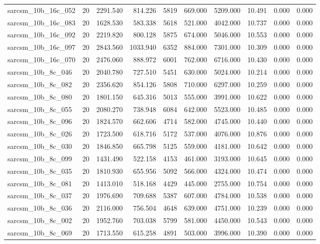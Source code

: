 \begin{tabular}{lrrrrrrrrr}
sarcsm\_10b\_16c\_052 & 20 & 2291.540 & 814.226 & 5819 & 669.000 & 5209.000 & 10.491 & 0.000 & 0.000 \\
sarcsm\_10b\_16c\_083 & 20 & 1628.530 & 583.338 & 5618 & 521.000 & 4042.000 & 10.737 & 0.000 & 0.000 \\
sarcsm\_10b\_16c\_092 & 20 & 2219.820 & 800.128 & 5875 & 674.000 & 5046.000 & 10.553 & 0.000 & 0.000 \\
sarcsm\_10b\_16c\_097 & 20 & 2843.560 & 1033.940 & 6352 & 884.000 & 7301.000 & 10.309 & 0.000 & 0.000 \\
sarcsm\_10b\_16c\_070 & 20 & 2476.060 & 888.972 & 6001 & 762.000 & 6716.000 & 10.430 & 0.000 & 0.000 \\
sarcsm\_10b\_8c\_046 & 20 & 2040.780 & 727.510 & 5451 & 630.000 & 5024.000 & 10.214 & 0.000 & 0.000 \\
sarcsm\_10b\_8c\_082 & 20 & 2356.620 & 854.126 & 5808 & 710.000 & 6297.000 & 10.259 & 0.000 & 0.000 \\
sarcsm\_10b\_8c\_080 & 20 & 1801.150 & 645.316 & 5013 & 555.000 & 3991.000 & 10.622 & 0.000 & 0.000 \\
sarcsm\_10b\_8c\_055 & 20 & 2080.270 & 738.948 & 6084 & 642.000 & 5523.000 & 10.485 & 0.000 & 0.000 \\
sarcsm\_10b\_8c\_096 & 20 & 1824.570 & 662.606 & 4714 & 582.000 & 4745.000 & 10.440 & 0.000 & 0.000 \\
sarcsm\_10b\_8c\_026 & 20 & 1723.500 & 618.716 & 5172 & 537.000 & 4076.000 & 10.876 & 0.000 & 0.000 \\
sarcsm\_10b\_8c\_030 & 20 & 1846.850 & 665.798 & 5125 & 559.000 & 4181.000 & 10.642 & 0.000 & 0.000 \\
sarcsm\_10b\_8c\_099 & 20 & 1431.490 & 522.158 & 4153 & 461.000 & 3193.000 & 10.645 & 0.000 & 0.000 \\
sarcsm\_10b\_8c\_035 & 20 & 1810.930 & 655.956 & 5092 & 566.000 & 4324.000 & 10.474 & 0.000 & 0.000 \\
sarcsm\_10b\_8c\_081 & 20 & 1413.010 & 518.168 & 4429 & 445.000 & 2755.000 & 10.754 & 0.000 & 0.000 \\
sarcsm\_10b\_8c\_037 & 20 & 1976.690 & 709.688 & 5387 & 607.000 & 4784.000 & 10.538 & 0.000 & 0.000 \\
sarcsm\_10b\_8c\_036 & 20 & 2116.000 & 756.504 & 4648 & 639.000 & 4751.000 & 10.239 & 0.000 & 0.000 \\
sarcsm\_10b\_8c\_002 & 20 & 1952.760 & 703.038 & 5799 & 581.000 & 4450.000 & 10.543 & 0.000 & 0.000 \\
sarcsm\_10b\_8c\_069 & 20 & 1713.550 & 615.258 & 4891 & 503.000 & 3996.000 & 10.390 & 0.000 & 0.000 \\

\end{tabular}
